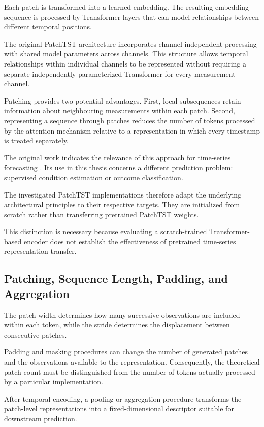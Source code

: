 Each patch is transformed into a learned embedding. The resulting embedding sequence is processed by Transformer layers that can model relationships between different temporal positions.

The original PatchTST architecture incorporates channel-independent processing with shared model parameters across channels. This structure allows temporal relationships within individual channels to be represented without requiring a separate independently parameterized Transformer for every measurement channel.

Patching provides two potential advantages. First, local subsequences retain information about neighbouring measurements within each patch. Second, representing a sequence through patches reduces the number of tokens processed by the attention mechanism relative to a representation in which every timestamp is treated separately.

The original work indicates the relevance of this approach for time-series forecasting \parencite{Nie2023PatchTST}. Its use in this thesis concerns a different prediction problem: supervised condition estimation or outcome classification.

The investigated PatchTST implementations therefore adapt the underlying architectural principles to their respective targets. They are initialized from scratch rather than transferring pretrained PatchTST weights.

This distinction is necessary because evaluating a scratch-trained Transformer-based encoder does not establish the effectiveness of pretrained time-series representation transfer.

\subsection{Patching, Sequence Length, Padding, and Aggregation}

The patch width determines how many successive observations are included within each token, while the stride determines the displacement between consecutive patches.

Padding and masking procedures can change the number of generated patches and the observations available to the representation. Consequently, the theoretical patch count must be distinguished from the number of tokens actually processed by a particular implementation.

After temporal encoding, a pooling or aggregation procedure transforms the patch-level representations into a fixed-dimensional descriptor suitable for downstream prediction.

